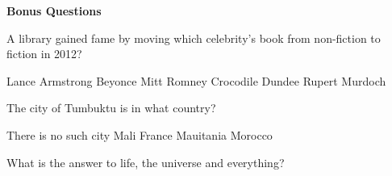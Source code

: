 \documentclass[10pt,addpoints]{exam}
\begin{document}
\begin{questions}
\begin{minipage}{\linewidth}
\end{minipage}





\newpage
\begin{center}
{\Large \textbf{Bonus Questions}}
\end{center}

\par\vspace{0.100000in}\begin{minipage}{\linewidth}
\bonusquestion[2]
A library gained fame by moving which celebrity's book from non-fiction to fiction in 2012?
\medskip
\begin{choices}
\choice Lance Armstrong
\choice Beyonce
\choice Mitt Romney
\choice Crocodile Dundee
\choice Rupert Murdoch
\end{choices}
\setlength\answerlinelength{1in}
\answerline[A]

\end{minipage}


\par\vspace{0.100000in}\begin{minipage}{\linewidth}
\bonusquestion[2]
The city of Tumbuktu is in what country?
\medskip
\begin{choices}
\choice There is no such city
\choice Mali
\choice France
\choice Mauitania
\choice Morocco
\end{choices}
\setlength\answerlinelength{1in}
\answerline[B]

\end{minipage}


\par\vspace{0.100000in}\begin{minipage}{\linewidth}
\vspace{.35cm}\bonusquestion[2]
What is the answer to life, the universe and everything?
\vspace{.25cm}\setlength\answerlinelength{3in}
\answerline[42]
\end{minipage}





\end{questions}
\end{document}
